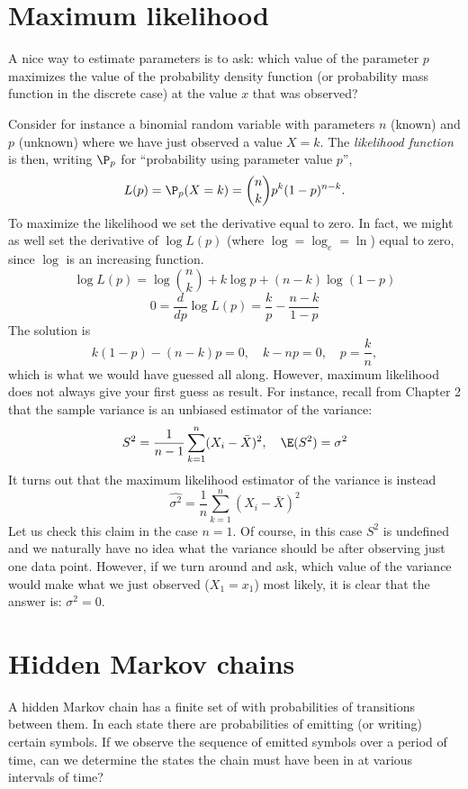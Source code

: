 \section{Maximum likelihood}

	A nice way to estimate parameters is to ask: which value of the parameter $p$ maximizes the value of the probability density function (or probability mass function in the discrete case) at the value $x$ that was observed?

	Consider for instance a binomial random variable with parameters $n$ (known) and $p$ (unknown) where we have just observed a value $X=k$. The \emph{likelihood function} is then, writing $\P_p$ for ``probability using parameter value $p$'',
	\[
		L(p) = \P_p(X=k) = \binom{n}{k} p^k (1-p)^{n-k}.
	\]
	To maximize the likelihood we set the derivative equal to zero. In fact, we might as well set the derivative of $\log L(p)$ (where $\log=\log_e=\ln$) equal to zero, since $\log$ is an increasing function.
	\[
		\log L(p) = \log\binom{n}{k} + k\log p + (n-k)\log (1-p)
	\]
	\[
		0 = \frac{d}{dp} \log L(p) = \frac{k}p - \frac{n-k}{1-p}
	\]
	The solution is
	\[
		k(1-p) - (n-k)p = 0,\quad k-np=0,\quad p = \frac{k}n,
	\]
	which is what we would have guessed all along.
	However, maximum likelihood does not always give your first guess as result.
	For instance, recall from Chapter 2 that the sample variance is an unbiased estimator of the variance:
	\[
		S^2 = \frac1{n-1}\sum_{k=1}^n (X_i-\bar X)^2,\quad \E(S^2)=\sigma^2
	\]
	It turns out that the maximum likelihood estimator of the variance is instead
	\[
		\widehat{\sigma^2} = \frac1{n}\sum_{k=1}^n (X_i-\bar X)^2
	\]
	Let us check this claim in the case $n=1$. Of course, in this case $S^2$ is undefined and we naturally have no idea what the variance should be after observing just one data point. However, if we turn around and ask, which value of the variance would make what we just observed ($X_1=x_1$) most likely, it is clear that the answer is: $\sigma^2=0$.
\section{Hidden Markov chains}
	A hidden Markov chain has a finite set of  with probabilities of transitions between them.
	In each state there are probabilities of emitting (or writing) certain symbols.
	If we observe the sequence of emitted symbols over a period of time, can we determine the states the chain must have been in at various intervals of time?

